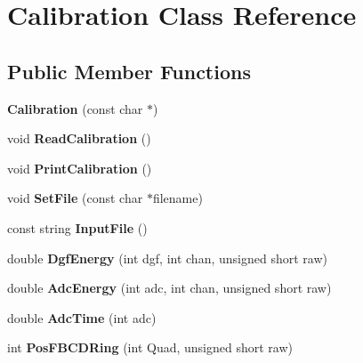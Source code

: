 \hypertarget{class_calibration}{}\section{Calibration Class Reference}
\label{class_calibration}
\subsection*{Public Member Functions}
\begin{DoxyCompactItemize}
\item 
\mbox{\label{class_calibration_a981f7a519754aecbdd3fbd837a5b5762}} 
{\bfseries Calibration} (const char $\ast$)
\item 
\mbox{\label{class_calibration_ad675a1c74ecd23e3af37fcffdeeed246}} 
void {\bfseries Read\+Calibration} ()
\item 
\mbox{\label{class_calibration_af224d188d64080db8d14eb0ddbb909f7}} 
void {\bfseries Print\+Calibration} ()
\item 
\mbox{\label{class_calibration_aec8340a8b2134c9cb51b685c928c4cee}} 
void {\bfseries Set\+File} (const char $\ast$filename)
\item 
\mbox{\label{class_calibration_a10affa676c2fb505d3075d23c3bf0157}} 
const string {\bfseries Input\+File} ()
\item 
\mbox{\label{class_calibration_a0ea90a9b417ec5e50312b4bba2875f70}} 
double {\bfseries Dgf\+Energy} (int dgf, int chan, unsigned short raw)
\item 
\mbox{\label{class_calibration_a07ba44fdc31250e347939588759d2796}} 
double {\bfseries Adc\+Energy} (int adc, int chan, unsigned short raw)
\item 
\mbox{\label{class_calibration_a860b3c2c4a2350009bbbf337aa56a212}} 
double {\bfseries Adc\+Time} (int adc)
\item 
\mbox{\label{class_calibration_a65ab7c201643a2bc8cb366b9ac20ab3b}} 
int {\bfseries Pos\+F\+B\+C\+D\+Ring} (int Quad, unsigned short raw)

\end{DoxyCompactItemize}
